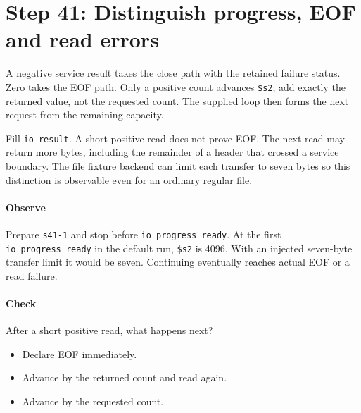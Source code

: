 \section{Step 41: Distinguish progress, EOF and read errors}
A negative service result takes the close path with the retained failure
status. Zero takes the EOF path. Only a positive count advances
\texttt{\$s2}; add exactly the returned value, not the requested count. The
supplied loop then forms the next request from the remaining capacity.

Fill \texttt{io\_result}. A short positive read does not prove EOF. The next
read may return more bytes, including the remainder of a header that crossed a
service boundary. The file fixture backend can limit each transfer to seven
bytes so this distinction is observable even for an ordinary regular file.

\paragraph{Observe} Prepare \texttt{s41-1} and stop before
\texttt{io\_progress\_ready}. At the first \texttt{io\_progress\_ready} in the default
run, \texttt{\$s2} is 4096. With an injected seven-byte transfer limit it
would be seven. Continuing eventually reaches actual EOF or a read failure.

\paragraph{Check} After a short positive read, what happens next?
\begin{itemize}
  \item[A.] Declare EOF immediately.
  \item[B.] Advance by the returned count and read again.
  \item[C.] Advance by the requested count.
\end{itemize}
